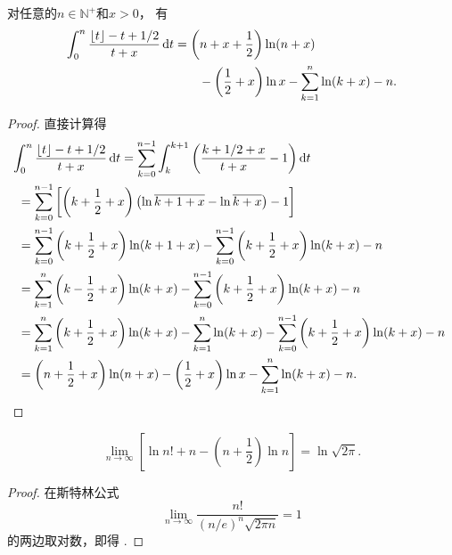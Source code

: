 \begin{lemma}\label{theorem:定积分.伽马函数的斯特灵近似.引理3}
对任意的\(n\in\mathbb{N}^+\)和\(x>0\)，
有\begin{equation}\label{equation:定积分.伽马函数的斯特灵近似.引理3}
	\begin{split}
		\int_0^n \frac{\lfloor t\rfloor - t + 1/2}{t + x} \dd{t}
		&= \left(n+x+\frac{1}{2}\right) \ln(n+x) \\
		&\hspace{20pt}
		- \left(\frac{1}{2}+x\right) \ln x
		- \sum\limits_{k=1}^n \ln(k+x) - n.
	\end{split}
\end{equation}
\begin{proof}
直接计算得\begin{align*}
	&\hspace{-5pt}
		\int_0^n \frac{\lfloor t\rfloor - t + 1/2}{t + x} \dd{t}
		= \sum\limits_{k=0}^{n-1} \int_k^{k+1} \left(
			\frac{k + 1/2 + x}{t + x} - 1
		\right) \dd{t} \\
	&= \sum\limits_{k=0}^{n-1} \left[
			\left(k + \frac{1}{2} + x\right)
			\left(\ln\overline{k+1+x} - \ln\overline{k+x}\right)
			- 1
		\right] \\
	&= \sum\limits_{k=0}^{n-1} \left(k + \frac{1}{2} + x\right) \ln(k+1+x)
		- \sum\limits_{k=0}^{n-1} \left(k + \frac{1}{2} + x\right) \ln(k+x)
		- n \\
	&= \sum\limits_{k=1}^n \left(k - \frac{1}{2} + x\right) \ln(k+x)
		- \sum\limits_{k=0}^{n-1} \left(k + \frac{1}{2} + x\right) \ln(k+x)
		- n \\
	&= \sum\limits_{k=1}^n \left(k + \frac{1}{2} + x\right) \ln(k+x)
		- \sum\limits_{k=1}^n \ln(k+x)
		- \sum\limits_{k=0}^{n-1} \left(k + \frac{1}{2} + x\right) \ln(k+x)
		- n \\
	&= \left(n + \frac{1}{2} + x\right) \ln(n+x)
		- \left(\frac{1}{2} + x\right) \ln x
		- \sum\limits_{k=1}^n \ln(k+x)
		- n.
	\qedhere
\end{align*}
\end{proof}
\end{lemma}

\begin{lemma}\label{theorem:定积分.伽马函数的斯特灵近似.引理4}
\begin{equation}\label{equation:定积分.伽马函数的斯特灵近似.引理4}
\lim\limits_{n\to\infty} \left[
\ln n! + n - \left(n+\frac{1}{2}\right) \ln n
\right]
= \ln\sqrt{2\pi}.
\end{equation}
\begin{proof}
在斯特林公式\[
\lim\limits_{n\to\infty} \frac{n!}{(n/e)^n \sqrt{2\pi n}} = 1
\]的两边取对数，即得 .
\end{proof}
\end{lemma}

